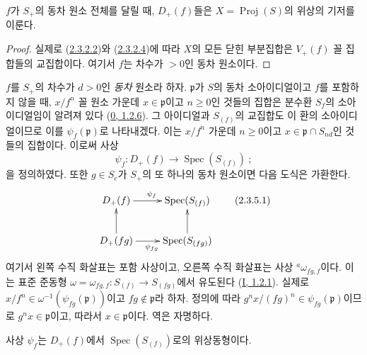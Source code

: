 \begin{proposition}[2.3.4]
\label{II.2.3.4-ko}
$f$가 $S_+$의 동차 원소 전체를 달릴 때, $D_+(f)$들은
$X=\operatorname{Proj}(S)$의 위상의 기저를 이룬다.
\end{proposition}

\begin{proof}
실제로 (\hyperref[II.2.3.2.2-ko]{2.3.2.2})와
(\hyperref[II.2.3.2.4-ko]{2.3.2.4})에 따라 $X$의 모든 닫힌 부분집합은
$V_+(f)$ 꼴 집합들의 교집합이다. 여기서 $f$는 차수가 $>0$인 동차
원소이다.
\end{proof}

\begin{env}[2.3.5]
\label{II.2.3.5-ko}
$f$를 $S_+$의 차수가 $d>0$인 \emph{동차} 원소라 하자.
$\mathfrak{p}$가 $S$의 동차 소아이디얼이고 $f$를 포함하지 않을 때,
$x/f^n$ 꼴 원소
가운데 $x\in\mathfrak{p}$이고 $n\geq 0$인 것들의 집합은 분수환
$S_f$의 소아이디얼임이 알려져 있다
(\hyperref[0.1.2.6-ko]{0, 1.2.6}). 그 아이디얼과 $S_{(f)}$의 교집합도
이 환의 소아이디얼이므로 이를 $\psi_f(\mathfrak{p})$로 나타내겠다.
이는 $x/f^n$ 가운데 $n\geq 0$이고
$x\in\mathfrak{p}\cap S_{nd}$인 것들의 집합이다. 이로써 사상
\[
  \psi_f:D_+(f)\longrightarrow\operatorname{Spec}(S_{(f)})~;
\]
을 정의하였다. 또한 $g\in S_e$가 $S_+$의 또 하나의 동차 원소이면 다음
도식은 가환한다.
\[
  \label{II.2.3.5.1-ko}
  \xymatrix{
    D_+(f)\ar[r]^{\psi_f}
    & \operatorname{Spec}(S_{(f)})\\
    D_+(fg)\ar[u]\ar[r]_{\psi_{fg}}
    & \operatorname{Spec}(S_{(fg)})\ar[u]
  }
  \tag{2.3.5.1}
\]
여기서 왼쪽 수직 화살표는 포함 사상이고, 오른쪽 수직 화살표는 사상
${}^a\omega_{fg,f}$이다. 이는 표준 준동형
$\omega=\omega_{fg,f}:S_{(f)}\to S_{(fg)}$에서 유도된다
(\hyperref[I.1.2.1-ko]{I, 1.2.1}). 실제로
$x/f^n\in\omega^{-1}(\psi_{fg}(\mathfrak{p}))$이고
$fg\notin\mathfrak{p}$라 하자. 정의에 따라
$g^n x/(fg)^n\in\psi_{fg}(\mathfrak{p})$이므로
$g^n x\in\mathfrak{p}$이고, 따라서 $x\in\mathfrak{p}$이다. 역은
자명하다.
\end{env}

\begin{proposition}[2.3.6]
\label{II.2.3.6-ko}
사상 $\psi_f$는 $D_+(f)$에서 $\operatorname{Spec}(S_{(f)})$로의
위상동형이다.
\end{proposition}

